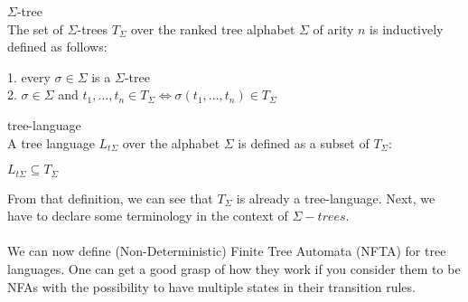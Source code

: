 \documentclass{llncs}
\begin{document}
\begin{definition}{\(\Sigma\)-tree \cite{automata-xml}}
	\\
	The set of \(\Sigma\)-trees \(T_\Sigma\) over the ranked tree alphabet \(\Sigma\) of arity \(n\) is inductively defined as follows:
	\begin{center}
		1. every \(\sigma \in \Sigma\) is a \(\Sigma\)-tree\\
		2. \(\sigma \in \Sigma\) and \(t_1,...,t_n \in T_\Sigma \iff \sigma(t_1,...,t_n) \in T_\Sigma\) 
	\end{center}
\end{definition}

\pagebreak

\begin{definition}{tree-language \cite{automata-xml}}
	\\
	A tree language \(L_{t\Sigma}\) over the alphabet \(\Sigma\) is defined as a subset of \(T_\Sigma\):
	\begin{center}
		\(L_{t\Sigma} \subseteq T_\Sigma\)
	\end{center}	
\end{definition}

From that definition, we can see that \(T_\Sigma\) is already a tree-language.
Next, we have to declare some terminology in the context of $\Sigma-trees$.
\\
\\
We can now define (Non-Deterministic) Finite Tree Automata (NFTA) for tree languages. One can get a good grasp of how they work if you consider them to be NFAs with the possibility to have multiple states in their transition rules.
\end{document}
